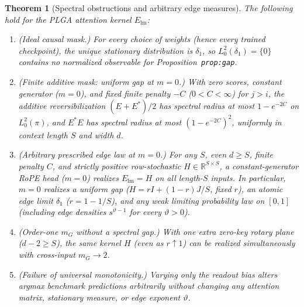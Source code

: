 \documentclass[11pt]{article}
\theoremstyle{plain}
\newtheorem{theorem}{Theorem}
\theoremstyle{definition}
\theoremstyle{remark}
\begin{document}
\begin{theorem}[Spectral obstructions and arbitrary edge measures]\label{thm:spectral}
The following hold for the PLGA attention kernel $E_{\mathrm{lm}}$:
\begin{enumerate}[leftmargin=2em,label=\textup{(\arabic*)}]
\item \emph{(Ideal causal mask.)} For every choice of weights (hence every trained checkpoint), the unique stationary distribution is $\delta_1$, so $L^2_0(\delta_1) = \{0\}$ contains no normalized observable for Proposition~\texttt{prop:gap}.
\item \emph{(Finite additive mask: uniform gap at $m = 0$.)} With zero scores, constant generator ($m = 0$), and fixed finite penalty $-C$ ($0 < C < \infty$) for $j > i$, the additive reversibilization $(E + E^*)/2$ has spectral radius at most $1 - e^{-2C}$ on $L^2_0(\pi)$, and $E^*E$ has spectral radius at most $(1 - e^{-2C})^2$, uniformly in context length $S$ and width $d$.
\item \emph{(Arbitrary prescribed edge law at $m = 0$.)} For any $S$, even $d \ge S$, finite penalty $C$, and strictly positive row-stochastic $H \in \mathbb{R}^{S \times S}$, a constant-generator RoPE head ($m = 0$) realizes $E_{\mathrm{lm}} = H$ on all length-$S$ inputs. In particular, $m = 0$ realizes a uniform gap ($H = rI + (1-r)J/S$, fixed $r$), an atomic edge limit $\delta_1$ ($r = 1 - 1/S$), and any weak limiting probability law on $[0, 1]$ (including edge densities $s^{\vartheta - 1}$ for every $\vartheta > 0$).
\item \emph{(Order-one $m_G$ without a spectral gap.)} With one extra zero-key rotary plane ($d - 2 \ge S$), the same kernel $H$ (even as $r \uparrow 1$) can be realized simultaneously with cross-input $m_G \to 2$.
\item \emph{(Failure of universal monotonicity.)} Varying only the readout bias alters argmax benchmark predictions arbitrarily without changing any attention matrix, stationary measure, or edge exponent $\vartheta$.
\end{enumerate}
\end{theorem}
\end{document}
